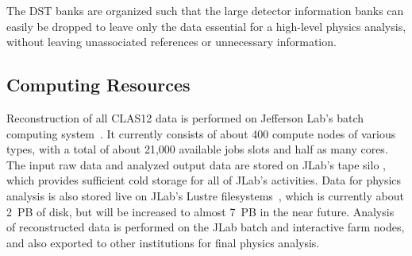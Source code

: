\noindent
The DST banks are organized such that the large detector information banks can easily be dropped to leave only
the data essential for a high-level physics analysis, without leaving unassociated references or unnecessary information.

\subsection{Computing Resources}

Reconstruction of all CLAS12 data is performed on Jefferson Lab's batch computing system~\cite{jlab-batch-farm}.
It currently consists of about 400 compute nodes of various types, with a total of about 21,000 available jobs
slots and half as many cores.  The input raw data and analyzed output data are stored on JLab's tape silo
\cite{jlab-tape-silo}, which provides sufficient cold storage for all of JLab's activities.  Data for physics analysis is
also stored live on JLab's Lustre filesystems~\cite{jlab-lustre}, which is currently about 2~PB of disk, but will be
increased to almost 7~PB in the near future. Analysis of reconstructed data is performed on the JLab batch and
interactive farm nodes, and also exported to other institutions for final physics analysis.
